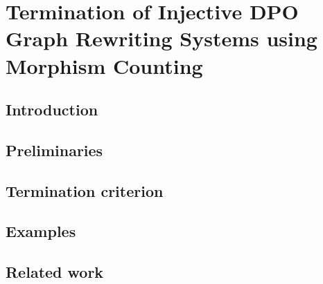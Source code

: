 \documentclass{report}
\begin{document}
% 

% 

\chapter{Termination of Injective DPO Graph Rewriting
Systems using Morphism Counting}
\label{chap:subgraph_counting}

\section{Introduction}
\label{subgraph_counting:sec:intro}


\section{Preliminaries} 
\label{subgraph_counting:sec:pre} 


 
  
\section{Termination criterion}
\label{subgraph_counting:sec:termination} 

 

\section{Examples}
\label{subgraph_counting:sec:examples}


  
\section{Related work}
\label{subgraph_counting:sec:related_work} 

\end{document}
